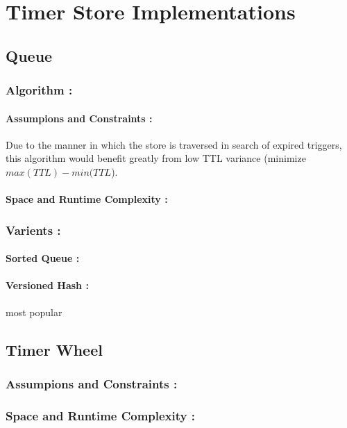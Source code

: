 \documentclass[twocolumn,a4paper]{article}
\begin{document}
\section{Timer Store Implementations}


\subsection{Queue}

\subsubsection{Algorithm :}

\paragraph{Assumpions and Constraints :}
Due to the manner in which the store is traversed in search of expired triggers, this algorithm would benefit greatly from low TTL variance (minimize $max(TTL)-min(TTL$).

\paragraph{Space and Runtime Complexity :}

\subsubsection{Varients :}

\paragraph{Sorted Queue :}

\paragraph{Versioned Hash :}
most popular



\subsection{Timer Wheel}

\subsubsection{Assumpions and Constraints :}

\subsubsection{Space and Runtime Complexity :}
\end{document}
